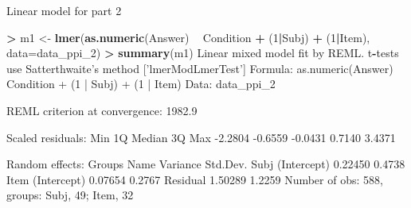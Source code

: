 \documentclass[ignorenonframetext,]{beamer}
\newenvironment{Shaded}{\begin{snugshade}}{\end{snugshade}}
\newcommand{\KeywordTok}[1]{\textcolor[rgb]{0.13,0.29,0.53}{\textbf{#1}}}
\newcommand{\DataTypeTok}[1]{\textcolor[rgb]{0.13,0.29,0.53}{#1}}
\newcommand{\DecValTok}[1]{\textcolor[rgb]{0.00,0.00,0.81}{#1}}
\newcommand{\StringTok}[1]{\textcolor[rgb]{0.31,0.60,0.02}{#1}}
\newcommand{\OperatorTok}[1]{\textcolor[rgb]{0.81,0.36,0.00}{\textbf{#1}}}
\newcommand{\NormalTok}[1]{#1}
\begin{document}
\begin{frame}{Linear model for part 2}

\tiny

\begin{Shaded}
\begin{Highlighting}[]
\OperatorTok{>}\StringTok{ }\NormalTok{m1 <-}\StringTok{ }\KeywordTok{lmer}\NormalTok{(}\KeywordTok{as.numeric}\NormalTok{(Answer) }\OperatorTok{~}\StringTok{ }\NormalTok{Condition }\OperatorTok{+}\StringTok{ }\NormalTok{(}\DecValTok{1}\OperatorTok{|}\NormalTok{Subj) }\OperatorTok{+}\StringTok{ }\NormalTok{(}\DecValTok{1}\OperatorTok{|}\NormalTok{Item), }\DataTypeTok{data=}\NormalTok{data_ppi_}\DecValTok{2}\NormalTok{)}
\OperatorTok{>}\StringTok{ }\KeywordTok{summary}\NormalTok{(m1)}
\NormalTok{Linear mixed model fit by REML. t}\OperatorTok{-}\NormalTok{tests use Satterthwaite}\StringTok{'s method ['}\NormalTok{lmerModLmerTest}\StringTok{']}
\StringTok{Formula: as.numeric(Answer) ~ Condition + (1 | Subj) + (1 | Item)}
\StringTok{   Data: data_ppi_2}

\StringTok{REML criterion at convergence: 1982.9}

\StringTok{Scaled residuals: }
\StringTok{    Min      1Q  Median      3Q     Max }
\StringTok{-2.2804 -0.6559 -0.0431  0.7140  3.4371 }

\StringTok{Random effects:}
\StringTok{ Groups   Name        Variance Std.Dev.}
\StringTok{ Subj     (Intercept) 0.22450  0.4738  }
\StringTok{ Item     (Intercept) 0.07654  0.2767  }
\StringTok{ Residual             1.50289  1.2259  }
\StringTok{Number of obs: 588, groups:  Subj, 49; Item, 32}
\end{Highlighting}
\end{Shaded}

\end{frame}
\end{document}
